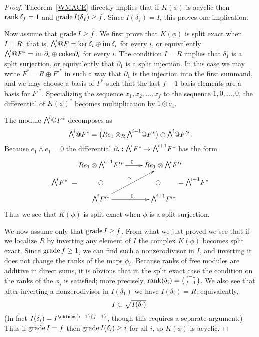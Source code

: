 \begin{proof}
Theorem~\ref{WMACE} 
directly 
implies that if $K(\phi)$ is acyclic then
$\operatorname{rank} \delta_{f} = 1$ and $\operatorname{grade} I(\delta_{f}) \geq f$. Since
$I(\delta_{f}) = I$, this proves one implication.

Now assume that $\operatorname{grade} I \geq f$. We first prove that
$K(\phi)$ is 
split exact
%
when $I = R$; that is, 
$\mwedge^{i}@F = \ker \delta_{i} \oplus \im \delta_{i}$ 
for every $i$, or equivalently
$\mwedge^{i}@F^{*} = \im \partial_{i}\oplus\coker \partial_{i}$ for
every $i$. The condition $I=R$ implies that $\delta_{1}$ is a split
surjection,
or equivalently that
$\partial_{1}$ is a split injection. In this case we may write $F^{*}
= R\oplus F'^{*}$ in such a way that $\partial_{1}$ is the injection
into the first summand, and we may
choose a basis of $F^{*}$ such that the last $f-1$ basis
elements are a basis for $F'^{*}$.
Specializing the sequence $x_{1},x_{2}, \dots, x_{f}$ to the sequence $1,
0,\dots, 0$, the differential of $K(\phi)^{*}$
becomes  multiplication by  $1\otimes e_{1}$.

The module
$\mwedge^{i}@F^{*}$  decomposes as
$$
\mwedge^{i}@F^{*} = \bigl(Re_{1}\otimes_{R} \mwedge^{i-1}@F^{*} \bigr)
\oplus \mwedge^{i}@F'^{*}.
$$
Because $e_{1}\wedge e_{1} = 0$ the differential 
$\partial_{i}: \mwedge^{i}F^{*} \to \mwedge^{i+1}F^{*}$ has the form
$$
\xymatrix@R=6pt{
Re_{1}\otimes \mwedge^{i-1}F'^{*} \ar[r]^{0}&  Re_{1}\otimes \mwedge^{i}F'^{*}\\
\llap{$\mwedge^{i}F^{*}\ =$\hskip3em}
 \oplus&\quad \oplus\qquad\rlap{$\quad= \mwedge^{i+1}F^{*}$}\\
\mwedge^{i}F'^{*}\ar[uur]^{\cong}\ar[r]^{0}& \mwedge^{i+1}F'^{*}
}
$$
Thus we see that $K(\phi)$ is split exact when $\phi$ is a split
surjection.

We now assume only that $\operatorname{grade} I\geq f$. From what we just proved we
see that if we localize
$R$ by inverting any element of $I$ the complex $K(\phi)$ becomes split
exact. Since $\operatorname{grade} f\geq 1$,
we can find such  a nonzerodivisor in $I$, and inverting it does not
change the ranks of the
maps $\phi_{i}$. Because ranks of free modules are additive in direct
sums, it is obvious that
in the split exact case the condition on the ranks of the $\phi_{i}$
is satisfied; more precisely,
$\rank(\delta_{i}) = \tbinom{i-1}{f-1}$. We also see that after inverting
a nonzerodivisor in $I(\delta_{1})$ we have $I(\delta_{i}) = R$;
equivalently,
$$
\tsty %
I  \subset \sqrt {I(\delta_{i})}.
$$
(In fact $I(\delta_{i}) = I^{\sbinom{i-1}{f-1}}$, though this requires a
separate argument.) Thus if $\operatorname{grade} I = f$ then  $\operatorname{grade} I(\delta_{i})
\geq i$ for all $i$, so $K(\phi)$ is acyclic.
\end{proof}

